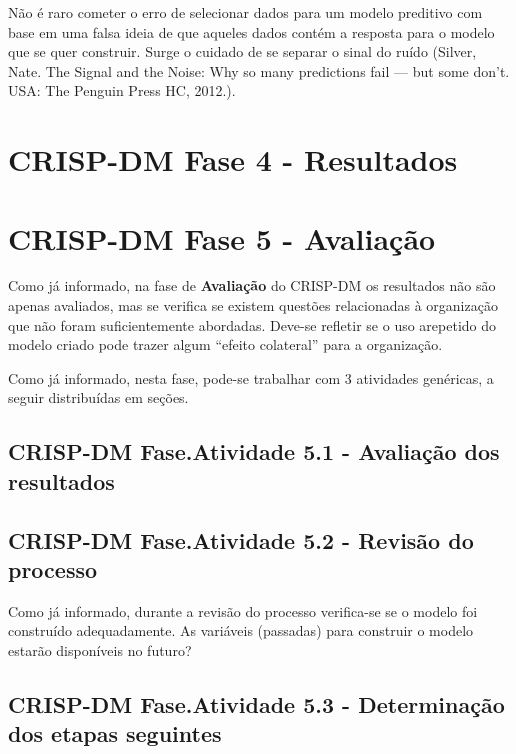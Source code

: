\documentclass[]{article}
\begin{document}
Não é raro cometer o erro de selecionar dados para um modelo preditivo
com base em uma falsa ideia de que aqueles dados contém a resposta para
o modelo que se quer construir. Surge o cuidado de se separar o sinal do
ruído (Silver, Nate. The Signal and the Noise: Why so many predictions
fail --- but some don't. USA: The Penguin Press HC, 2012.).

\section{\texorpdfstring{CRISP-DM Fase 4 -
\textbf{Resultados}}{CRISP-DM Fase 4 - Resultados}}\label{crisp-dm-fase-4---resultados}

\section{\texorpdfstring{CRISP-DM Fase 5 -
\textbf{Avaliação}}{CRISP-DM Fase 5 - Avaliação}}\label{crisp-dm-fase-5---avaliacao}

Como já informado, na fase de \textbf{Avaliação} do CRISP-DM os
resultados não são apenas avaliados, mas se verifica se existem questões
relacionadas à organização que não foram suficientemente abordadas.
Deve-se refletir se o uso arepetido do modelo criado pode trazer algum
``efeito colateral'' para a organização.

Como já informado, nesta fase, pode-se trabalhar com 3 atividades
genéricas, a seguir distribuídas em seções.

\subsection{CRISP-DM Fase.Atividade 5.1 - Avaliação dos
resultados}\label{crisp-dm-fase.atividade-5.1---avaliacao-dos-resultados}

\subsection{CRISP-DM Fase.Atividade 5.2 - Revisão do
processo}\label{crisp-dm-fase.atividade-5.2---revisao-do-processo}

Como já informado, durante a revisão do processo verifica-se se o modelo
foi construído adequadamente. As variáveis (passadas) para construir o
modelo estarão disponíveis no futuro?

\subsection{CRISP-DM Fase.Atividade 5.3 - Determinação dos etapas
seguintes}\label{crisp-dm-fase.atividade-5.3---determinacao-dos-etapas-seguintes}
\end{document}
